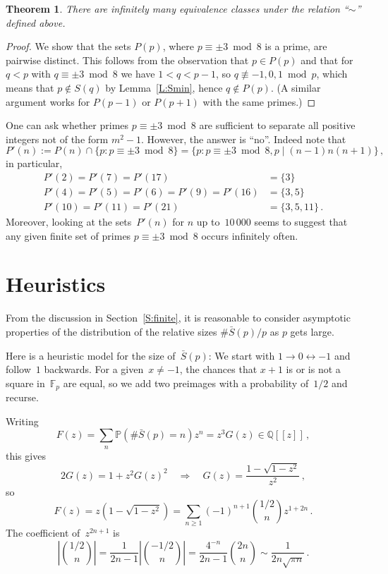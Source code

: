 \documentclass[12pt,a4paper]{amsart}
\newcommand{\Q}{{\mathbb Q}}
\newcommand{\F}{{\mathbb F}}
\newcommand{\BP}{{\mathbb P}}
\newtheorem{Theorem}{Theorem}[section]
\theoremstyle{definition}
\numberwithin{equation}{section}
\begin{document}
\begin{Theorem}
  There are infinitely many equivalence classes under the relation ``$\sim$'' defined above.
\end{Theorem}

\begin{proof}
  We show that the sets $P(p)$, where $p \equiv \pm 3 \bmod 8$ is a prime, are pairwise distinct.
  This follows from the observation that $p \in P(p)$ and that for $q < p$ with $q \equiv \pm 3 \bmod 8$ we have
  $1 < q < p - 1$, so $q \not\equiv -1, 0, 1 \bmod p$, which means that $p \notin S(q)$
  by Lemma~\ref{L:Smin}, hence $q \notin P(p)$.
  (A similar argument works for $P(p-1)$  or $P(p+1)$ with the same primes.)
\end{proof}

One can ask whether primes $p \equiv \pm 3 \bmod 8$ are sufficient to separate
all positive integers not of the form $m^2 - 1$. However, the answer is ``no''. Indeed note that
\[ P'(n) := P(n) \cap \{p : p \equiv \pm 3 \bmod 8\} = \{p : p \equiv \pm 3 \bmod 8, p \mid (n-1) n (n+1)\} \,, \]
in particular,
\begin{align*}
   P'(2) = P'(7) = P'(17) &= \{3\} \\
   P'(4) = P'(5) = P'(6) = P'(9) = P'(16) &= \{3, 5\} \\
   P'(10) = P'(11) = P'(21) &= \{3, 5, 11\} \,.
\end{align*}
Moreover, looking at the sets~$P'(n)$ for $n$ up to~$10\,000$
seems to suggest that any given finite set of primes $p \equiv \pm 3 \bmod 8$ occurs
infinitely often.


\section{Heuristics} \label{S:heuristics}

From the discussion in Section~\ref{S:finite}, it is reasonable to consider asymptotic
properties of the distribution of the relative sizes $\#\bar{S}(p)/p$ as $p$ gets large.

Here is a heuristic model for the size of~$\bar{S}(p)$:
We start with $1 \to 0 \leftrightarrow -1$ and follow~$1$ backwards.
For a given~$x \neq -1$, the chances that $x+1$ is or is not a square in~$\F_p$ are equal,
so we add two preimages with a probability of~$1/2$ and recurse.

Writing
\[ F(z) = \sum_n \BP(\#\bar{S}(p) = n) z^n = z^3 G(z) \in \Q[\![z]\!] \,, \]
this gives
\[ 2 G(z) = 1 + z^2 G(z)^2  \quad\Longrightarrow\quad  G(z) = \frac{1 - \sqrt{1-z^2}}{z^2}\,, \]
so
\[ F(z) = z (1 - \sqrt{1 - z^2}) = \sum_{n \geqslant 1} (-1)^{n+1} \binom{1/2}{n} z^{1+2n} \,. \]
The coefficient of~$z^{2n+1}$ is
\[ \left|\binom{1/2}{n}\right| = \frac{1}{2n-1} \left|\binom{-1/2}{n}\right|
     = \frac{4^{-n}}{2n-1} \binom{2n}{n}
     \sim \frac{1}{2n \sqrt{\pi n}} \,.
\]
\end{document}

